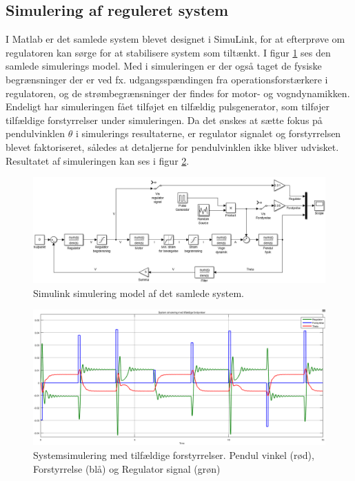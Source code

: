 \subsection{Simulering af reguleret system}
I Matlab er det samlede system blevet designet i SimuLink, for at efterprøve om regulatoren kan sørge for at stabilisere system som tiltænkt.
I figur \ref{fig:transfunc_sim} ses den samlede simulerings model.
Med i simuleringen er der også taget de fysiske begrænsninger der er ved fx. udgangsspændingen fra operationsforstærkere i regulatoren, og de strømbegrænsninger der findes for motor- og vogndynamikken.
Endeligt har simuleringen fået tilføjet en tilfældig pulsgenerator, som tilføjer tilfældige forstyrrelser under simuleringen.
Da det ønskes at sætte fokus på pendulvinklen $\theta$ i simulerings resultaterne, er regulator signalet og forstyrrelsen blevet faktoriseret, således at detaljerne for pendulvinklen ikke bliver udvisket.
Resultatet af simuleringen kan ses i figur \ref{fig:system_sim_stimuli}.
\begin{figure}[h!]
	\centering
	\includegraphics[width=1\textwidth]{billeder/transfunc_sim.png}
	\caption{Simulink simulering model af det samlede system.}
	\label{fig:transfunc_sim}
\end{figure}


\begin{figure}[h!]
	\centering
	\includegraphics[width=1\textwidth]{billeder/system_sim_stimuli.png}
	\caption[Systemsimulering med tilfældige forstyrrelser.]{Systemsimulering med tilfældige forstyrrelser. Pendul vinkel (rød), Forstyrrelse (blå) og Regulator signal (grøn)}
	\label{fig:system_sim_stimuli}
\end{figure}
\FloatBlock 

